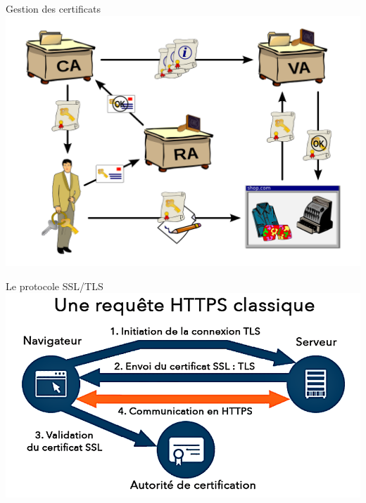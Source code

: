 \begin{frame}{Gestion des certificats}
    \includegraphics[width=\linewidth]{../medias/autorite-certification.png}
\end{frame}


\begin{frame}{Le protocole SSL/TLS}
    \includegraphics[width=\linewidth]{../medias/protocole-tls.png}
\end{frame}
